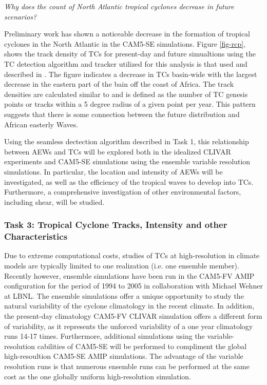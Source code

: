 \documentclass[11pt]{article}
\begin{document}

\emph{Why does the count of North Atlantic tropical cyclones decrease in future scenarios?}

Preliminary work has shown a noticeable decrease in the formation of tropical cyclones in the North Atlantic in the CAM5-SE simulations. Figure \ref{fig-rcp}, shows the track density of TCs for present-day and future simualtions using the TC detection algorithm and tracker utilized for this analysis is that used and described in \citet{Zhao2009}. The figure indicates a decrease in TCs basin-wide with the largest decrease in the eastern part of the bain off the coast of Africa. The track densities are calculated similar to \citet{Done2013} and is defined as the number of TC genesis points or tracks within a 5 degree radius of a given point per year. This pattern suggests that there is some connection between the future distribution and African easterly Waves.

Using the seamless dectection algorithm described in Task 1, this relationship between AEWs and TCs will be explored both in the idealized CLIVAR experiments and CAM5-SE simulations using the ensemble variable resolution simulations. In particular, the location and intensity of AEWs will be investigated, as well as the efficiency of the tropical waves to develop into TCs. Furthermore, a comprehensive investigation of other environmental factors, including shear, will be studied.

\subsubsection{Task 3: Tropical Cyclone Tracks, Intensity and other Characteristics}

Due to extreme computational costs, studies of TCs at high-resolution in climate models are typically limited to one realization (i.e. one ensemble member). Recently however, ensemble simulations have been run in the CAM5-FV AMIP configuration for the period of 1994 to 2005 in collaboration with Michael Wehner at LBNL. The ensemble simulations offer a unique opportunity to study the natural variability of the cyclone climatology in the recent climate. In addition, the present-day climatology CAM5-FV CLIVAR simulation offers a different form of variability, as it represents the unforced variability of a one year climatology runs 14-17 times. Furthermore, additional simulations using the variable-resolution cabilities of CAM5-SE will be performed to compliment the global high-resoultion CAM5-SE AMIP simulations. The advantage of the variable resolution runs is that numerous ensemble runs can be performed at the same cost as the one globally uniform high-resolution simulation.
\end{document}
